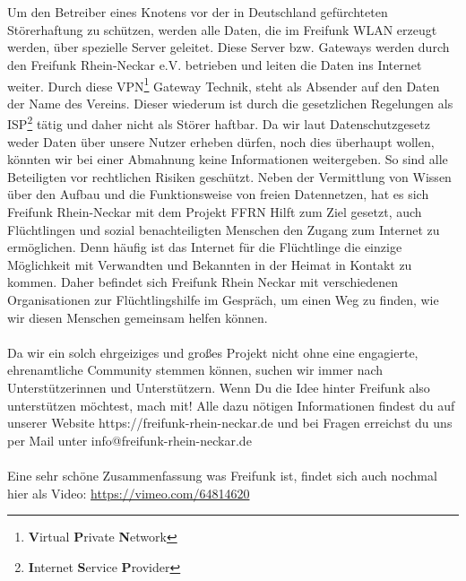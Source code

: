\documentclass[10pt,a4paper]{article}
\begin{document}
\\\\
Um den Betreiber eines Knotens vor der in Deutschland gefürchteten Störerhaftung zu schützen, werden alle Daten, die im Freifunk WLAN erzeugt werden, über spezielle
Server geleitet. Diese Server bzw. Gateways werden durch den Freifunk Rhein-Neckar e.V. betrieben und leiten die Daten ins Internet weiter. Durch diese
VPN\footnote{\textbf{V}irtual \textbf{P}rivate \textbf{N}etwork} Gateway Technik, steht als Absender auf den Daten der Name des Vereins. Dieser wiederum ist durch die gesetzlichen Regelungen als ISP\footnote{\textbf{I}nternet \textbf{S}ervice \textbf{P}rovider} tätig und daher nicht als Störer
haftbar. Da wir laut Datenschutzgesetz weder Daten über unsere Nutzer erheben dürfen, noch dies überhaupt wollen, könnten wir bei einer Abmahnung keine Informationen weitergeben.
So sind alle Beteiligten vor rechtlichen Risiken geschützt.
\newpage
\noindent
Neben der Vermittlung von Wissen über den Aufbau und die Funktionsweise von freien Datennetzen, hat es sich Freifunk Rhein-Neckar mit dem Projekt \glqq FFRN Hilft\grqq{} zum Ziel gesetzt, auch Flüchtlingen und
sozial benachteiligten Menschen den Zugang zum Internet zu ermöglichen. Denn häufig ist das Internet für die Flüchtlinge die einzige Möglichkeit mit Verwandten und Bekannten in der Heimat in
Kontakt zu kommen. Daher befindet sich Freifunk Rhein Neckar mit verschiedenen Organisationen zur Flüchtlingshilfe im Gespräch, um einen Weg zu finden, wie wir diesen Menschen gemeinsam helfen können.
\\\\
Da wir ein solch ehrgeiziges und großes Projekt nicht ohne eine engagierte, ehrenamtliche Community stemmen können, suchen wir immer nach Unterstützerinnen und Unterstützern. Wenn Du die Idee hinter Freifunk also
unterstützen möchtest, mach mit! Alle dazu nötigen Informationen findest du auf unserer Website https://freifunk-rhein-neckar.de und bei Fragen erreichst du uns per Mail unter info@freifunk-rhein-neckar.de
\\\\
Eine sehr schöne Zusammenfassung was Freifunk ist, findet sich auch nochmal hier als Video: \url{https://vimeo.com/64814620}
\end{document}
